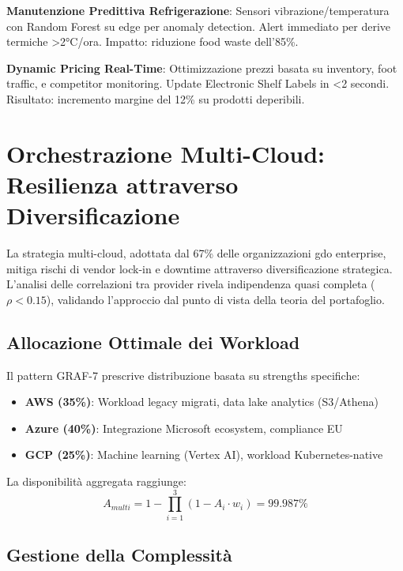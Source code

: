 \textbf{Manutenzione Predittiva Refrigerazione}: Sensori vibrazione/temperatura con Random Forest su edge per anomaly detection. Alert immediato per derive termiche >2°C/ora. Impatto: riduzione food waste dell'85\%.

\textbf{Dynamic Pricing Real-Time}: Ottimizzazione prezzi basata su inventory, foot traffic, e competitor monitoring. Update Electronic Shelf Labels in <2 secondi. Risultato: incremento margine del 12\% su prodotti deperibili.

\section{\texorpdfstring{Orchestrazione Multi-Cloud: Resilienza attraverso Diversificazione}{3.5 - Orchestrazione Multi-Cloud: Resilienza attraverso Diversificazione}}
\label{sec:multi_cloud}

La strategia multi-cloud, adottata dal 67\% delle organizzazioni \gls{gdo} enterprise, mitiga rischi di vendor lock-in e downtime attraverso diversificazione strategica. L'analisi delle correlazioni tra provider rivela indipendenza quasi completa ($\rho < 0.15$), validando l'approccio dal punto di vista della teoria del portafoglio\autocite{Tang2024portfolio}.

\subsection{\texorpdfstring{Allocazione Ottimale dei Workload}{3.5.1 - Allocazione Ottimale dei Workload}}

Il pattern GRAF-7 prescrive distribuzione basata su strengths specifiche:
\begin{itemize}
\item \textbf{AWS (35\%)}: Workload legacy migrati, data lake analytics (S3/Athena)
\item \textbf{Azure (40\%)}: Integrazione Microsoft ecosystem, compliance EU
\item \textbf{GCP (25\%)}: Machine learning (Vertex AI), workload Kubernetes-native
\end{itemize}

La disponibilità aggregata raggiunge:
$$A_{multi} = 1 - \prod_{i=1}^{3} (1 - A_i \cdot w_i) = 99.987\%$$

\subsection{\texorpdfstring{Gestione della Complessità}{3.5.2 - Gestione della Complessità}}

